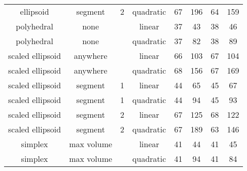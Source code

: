 \begin{center}
\begin{longtable}{ c c c c c c c c }
                ellipsoid &    segment &     2 &  quadratic &  67  &   196  &   64 &  159 \\
               polyhedral &       none &       &     linear &  37  &    43  &   38 &   46 \\
               polyhedral &       none &       &  quadratic &  37  &    82  &   38 &   89 \\
         scaled ellipsoid &   anywhere &       &     linear &  66  &   103  &   67 &  104 \\
         scaled ellipsoid &   anywhere &       &  quadratic &  68  &   156  &   67 &  169 \\
         scaled ellipsoid &    segment &     1 &     linear &  44  &    65  &   45 &   67 \\
         scaled ellipsoid &    segment &     1 &  quadratic &  44  &    94  &   45 &   93 \\
         scaled ellipsoid &    segment &     2 &     linear &  67  &   125  &   68 &  122 \\
         scaled ellipsoid &    segment &     2 &  quadratic &  67  &   189  &   63 &  146 \\
                  simplex & max volume &       &     linear &  41  &    44  &   41 &   45 \\
                  simplex & max volume &       &  quadratic &  41  &    94  &   41 &   84 \\


\end{longtable}
\end{center}
